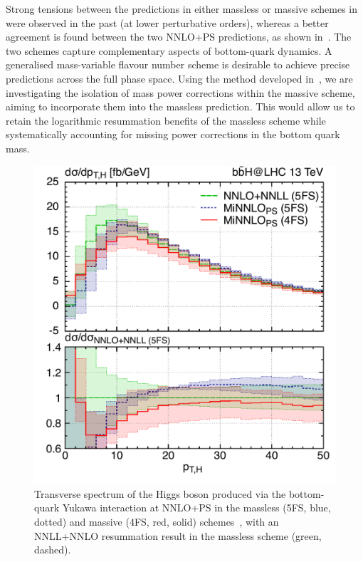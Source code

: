 \documentclass{FBR_Bericht_2025}
\begin{document}
\begin{refsection}
Strong tensions between the predictions in either massless or massive schemes in \bbH{} were observed in the past (at lower perturbative orders), 
whereas a better agreement is found between the two NNLO+PS predictions, as shown in~. 
The two schemes capture complementary aspects of bottom-quark dynamics. A generalised mass-variable flavour number scheme is desirable to achieve precise predictions across the full phase space. Using the method developed in~, we are investigating the isolation of mass power corrections within the massive scheme, aiming to incorporate them into the massless prediction. This would allow us to retain the logarithmic resummation benefits of the massless scheme while systematically accounting for missing power corrections in the bottom quark mass.

\begin{figure}[phtb]
\begin{center}
\includegraphics[width=0.95\linewidth]{plots/bbH__ptHspectrum.pdf}
\caption{Transverse spectrum of the Higgs boson produced via the bottom-quark Yukawa interaction at NNLO+PS in the massless (5FS, blue, dotted) and massive (4FS, red, solid) schemes~\cite{Biello:2024pgo}, with an NNLL+NNLO resummation result in the massless scheme (green, dashed).}
\label{phenofig:bbH}
\end{center}
\end{figure}
%

\end{refsection}
\end{document}
